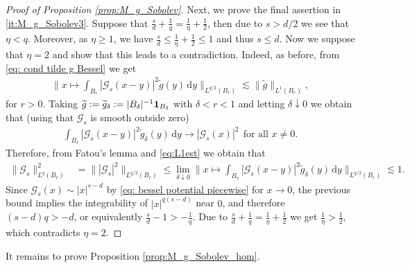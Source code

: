 \documentclass[reqno]{amsart}
\theoremstyle{plain}
\theoremstyle{remark}
\theoremstyle{plain}
\numberwithin{equation}{section}
\newcommand\cG{\mathscr{G}}
\newcommand{\wt}{\widetilde}
\newcommand{\di}{\mathrm{d}}
\newcommand{\one}{{{\bf 1}}}
\newcommand{\1}{\one}
\begin{document}
\begin{proof}[Proof of Proposition \ref{prop:M_g_Sobolev}]
Next, we prove the final assertion in \eqref{it:M_g_Sobolev3}.
Suppose that $\frac{s}{d}+\frac{1}{q}=\frac{1}{\eta} + \frac12$, then due to $s>d/2$ we see that $\eta<q$. 
Moreover, as $\eta\geq 1$, we have $\frac{s}{d}\leq \frac{1}{\eta} + \frac12\leq 1$ and thus $s\leq d$.
Now we suppose that $\eta=2$ and show that this leads to a contradiction. Indeed, as before, from \eqref{eq: cond tilde g Bessel} we get 
\begin{align}\label{eq:L1est}
\Big\|x\mapsto \int_{B_r} |\cG_s(x-y)|^2  \widetilde{g}(y) \,\di y\Big\|_{L^{q/2}(B_r)} 
 \lesssim \|\widetilde{g}\|_{L^{1}(B_r)},
 \end{align}
 for $r>0$.
Taking $ \widetilde{g} := \widetilde{g}_\delta:= |B_{\delta}|^{-1}\one_{B_{\delta}}$ with $\delta<r<1$ and letting $\delta\downarrow 0$ we obtain 
that (using that $\cG_s$ is smooth outside zero)
\begin{align*}
\int_{B_r} |\cG_s(x-y)|^2  \wt{g}_{\delta}(y) \,\di y\to |\cG_s(x)|^2 \ \ \text{for all $x\neq 0$.}
\end{align*}
Therefore, from Fatou's lemma and \eqref{eq:L1est} we obtain that 
\begin{align}
    \|\cG_s\|_{L^q(B_r)}^2 &= \big\||\cG_s|^2\big\|_{L^{q/2}(B_r)} \leq \lim_{\delta \downarrow 0} \Big\|x\mapsto \int_{B_r} |\cG_s(x-y)|^2  \wt{g}_{\delta}(y)\,\di y\Big\|_{L^{q/2}(B_r)} \lesssim 1.
\end{align}
Since $\cG_s(x)\sim |x|^{s-d}$ by \eqref{eq: bessel potential piecewise} 
for $x\to 0$, the previous bound implies the integrability of $|x|^{q(s-d)}$ near $0$, and therefore $(s-d)q>-d$, or equivalently $\frac{s}{d} -1 > -\frac{1}{q}$. 
Due to $\frac{s}{d}+\frac{1}{q}=\frac{1}{\eta} + \frac12$ we get $\tfrac{1}{\eta}>\tfrac{1}{2}$, which contradicts $\eta=2$.  
\end{proof}

It remains to prove Proposition \ref{prop:M_g_Sobolev_hom}.
\end{document}
